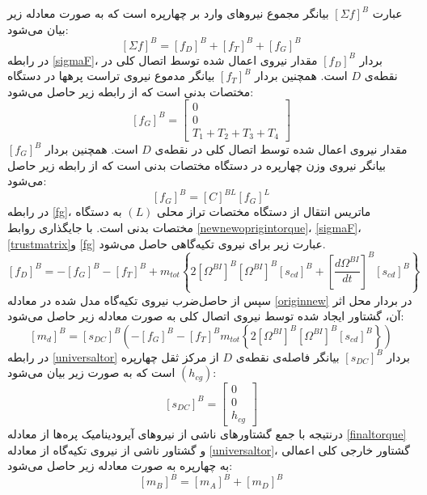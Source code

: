 عبارت 
$\left[\Sigma f\right]^B$
بیانگر مجموع نیروهای وارد بر چهارپره است که به صورت معادله زیر بیان می‌شود:
\begin{equation}\label{sigmaF}
	\left[\Sigma f\right]^B = \left[f_D\right]^B+\left[f_T\right]^B+
	\left[f_G\right]^B
\end{equation}
در رابطه 
\ref{sigmaF}، بردار 
$\left[f_D\right]^B$
مقدار نیروی اعمال‌ شده توسط اتصال کلی در نقطه‌ی
$D$
است. همچنین  بردار 
$\left[f_T\right]^B$
بیانگر مدموع نیروی تراست پرهها در دستگاه مختصات بدنی است که از رابطه زیر حاصل می‌شود:
\begin{equation}\label{trustmatrix}
	\left[f_G\right]^B = \begin{bmatrix}
		0\\0\\
		T_1+T_2+T_3+T_4
	\end{bmatrix}
\end{equation}
مقدار نیروی اعمال‌ شده توسط اتصال کلی در نقطه‌ی
$D$
است. همچنین  بردار 
$\left[f_G\right]^B$
بیانگر نیروی وزن چهارپره در دستگاه مختصات بدنی است که از رابطه زیر حاصل می‌شود:
\begin{equation}\label{fg}
	\left[f_G\right]^B = \left[C\right]^{BL}
	\left[f_G\right]^L
\end{equation}
در رابطه
\ref{fg}،
ماتریس انتقال از دستگاه مختصات تراز محلی
$(L)$
 به دستگاه مختصات بدنی است. با جایگذاری روابط
\ref{newnewoprigintorque}،
\ref{sigmaF}،
\ref{trustmatrix}و
\ref{fg}
عبارت زیر برای نیروی تكیه‌گاهی حاصل می‌شود.
\begin{equation}\label{originnew}
	\left[f_D\right]^B = 
	-\left[f_G\right]^B-
	\left[f_T\right]^B+
	m_{tot}\left\{2
	\left[\Omega^{BI}\right]^B
	\left[\Omega^{BI}\right]^B
	\left[s_{cd}\right]^B+
	\left[\dfrac{d\Omega^{BI}}{dt}\right]^B
	\left[s_{cd}\right]^B
	\right\}
\end{equation}
سپس از حاصل‌ضرب نیروی تكیه‌گاه مدل‌ شده در معادله
\ref{originnew}
 در بردار محل اثر آن، گشتاور ایجاد شده
توسط نیروی اتصال کلی به صورت معادله زیر حاصل می‌شود:
\begin{equation}\label{universaltor}
	\left[m_d\right]^B = \left[s_{DC}\right]^B\left(
	-\left[f_G\right]^B
	-\left[f_T\right]^B
	m_{tot}\left\{2
	\left[\Omega^{BI}\right]^B
	\left[\Omega^{BI}\right]^B
	\left[s_{cd}\right]^B
	\right\}
	\right)
\end{equation}
در رابطه
\ref{universaltor}
بردار 
$\left[s_{DC}\right]^B$
بیانگر فاصله‌ی نقطه‌ی 
$D$
از مرکز ثقل چهارپره 
$(h_{cg})$
است که به صورت زیر بیان می‌شود:
\begin{equation}
	\left[s_{DC}\right]^B = \begin{bmatrix}
		0\\0\\h_{cg}
	\end{bmatrix}
\end{equation}
 درنتیجه با جمع گشتاورهای ناشی از نیروهای آیرودینامیک پره‌ها از معادله 
 \ref{finaltorque}
 و گشتاور ناشی 
از نیروی تكیه‌گاه از معادله 
\ref{universaltor}، گشتاور خارجی کلی اعمالی به چهارپره به صورت معادله زیر حاصل 
می‌شود:
\begin{equation}\label{finalm}
	\left[m_B\right]^B = 
	\left[m_A\right]^B+
	\left[m_D\right]^B
\end{equation}

